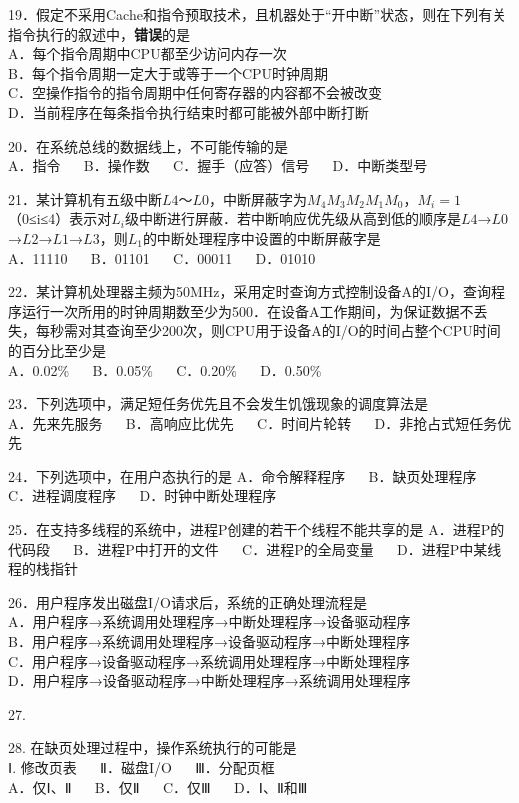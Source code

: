 19．假定不采用Cache和指令预取技术，且机器处于“开中断”状态，则在下列有关指令执行的叙述中，\textbf{错误}的是 \\
A．每个指令周期中CPU都至少访问内存一次 \\
B．每个指令周期一定大于或等于一个CPU时钟周期 \\
C．空操作指令的指令周期中任何寄存器的内容都不会被改变 \\
D．当前程序在每条指令执行结束时都可能被外部中断打断

20．在系统总线的数据线上，不可能传输的是 \\
A．指令 $\quad$ B．操作数 $\quad$ C．握手（应答）信号 $\quad$ D．中断类型号

21．某计算机有五级中断$L4$～$L0$，中断屏蔽字为$M_4M_3M_2M_1M_0$，$M_i=1$（0≤i≤4）表示对$L_i$级中断进行屏蔽．若中断响应优先级从高到低的顺序是$L4$→$L0$→$L2$→$L1$→$L3$，则$L_1$的中断处理程序中设置的中断屏蔽字是 \\
A．11110 $\quad$ B．01101 $\quad$ C．00011 $\quad$ D．01010

22．某计算机处理器主频为50MHz，采用定时查询方式控制设备A的I/O，查询程序运行一次所用的时钟周期数至少为500．在设备A工作期间，为保证数据不丢失，每秒需对其查询至少200次，则CPU用于设备A的I/O的时间占整个CPU时间的百分比至少是 \\
A．0.02\%  $\quad$ B．0.05\%  $\quad$ C．0.20\%  $\quad$ D．0.50\%

23．下列选项中，满足短任务优先且不会发生饥饿现象的调度算法是 \\
A．先来先服务 $\quad$ B．高响应比优先 $\quad$ C．时间片轮转 $\quad$ D．非抢占式短任务优先

24．下列选项中，在用户态执行的是
A．命令解释程序 $\quad$ B．缺页处理程序 $\quad$ C．进程调度程序 $\quad$ D．时钟中断处理程序

25．在支持多线程的系统中，进程P创建的若干个线程不能共享的是
A．进程P的代码段 $\quad$ B．进程P中打开的文件 $\quad$ C．进程P的全局变量 $\quad$ D．进程P中某线程的栈指针

26．用户程序发出磁盘I/O请求后，系统的正确处理流程是 \\
A．用户程序→系统调用处理程序→中断处理程序→设备驱动程序 \\
B．用户程序→系统调用处理程序→设备驱动程序→中断处理程序 \\
C．用户程序→设备驱动程序→系统调用处理程序→中断处理程序 \\
D．用户程序→设备驱动程序→中断处理程序→系统调用处理程序

27.

28. 在缺页处理过程中，操作系统执行的可能是 \\
Ⅰ. 修改页表 $\quad$ Ⅱ．磁盘I/O $\quad$ Ⅲ．分配页框 \\
A．仅Ⅰ、Ⅱ $\quad$ B．仅Ⅱ $\quad$ C．仅Ⅲ $\quad$ D．Ⅰ、Ⅱ和Ⅲ

